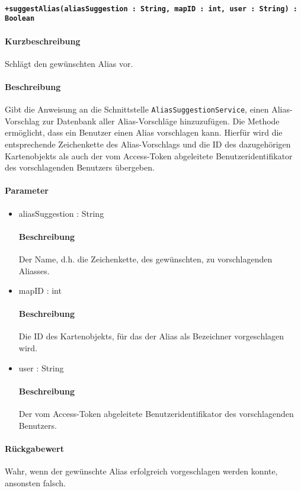 \paragraph*{\texttt{+suggestAlias(aliasSuggestion : String, mapID : int, user : String) : Boolean}}%
\paragraph*{Kurzbeschreibung}
Schlägt den gewünschten Alias vor.
\paragraph*{Beschreibung}
Gibt die Anweisung an die Schnittstelle \texttt{AliasSuggestionService}, einen Alias-Vorschlag zur Datenbank aller Alias-Vorschläge hinzuzufügen.
Die Methode ermöglicht, dass ein Benutzer einen Alias vorschlagen kann. 
Hierfür wird die entsprechende Zeichenkette des Alias-Vorschlags und die ID des dazugehörigen Kartenobjekts als auch der vom Access-Token abgeleitete Benutzeridentifikator des vorschlagenden Benutzers übergeben.
\paragraph*{Parameter}
\begin{itemize}
	\item aliasSuggestion : String
		\paragraph*{Beschreibung}
		Der Name, d.h. die Zeichenkette, des gewünschten, zu vorschlagenden Aliasses.
	\item mapID : int
		\paragraph*{Beschreibung}
		Die ID des Kartenobjekts, für das der Alias als Bezeichner vorgeschlagen wird.
	\item user : String
		\paragraph*{Beschreibung}
		Der vom Access-Token abgeleitete Benutzeridentifikator des vorschlagenden Benutzers.
\end{itemize}
\paragraph*{Rückgabewert}
Wahr, wenn der gewünschte Alias erfolgreich vorgeschlagen werden konnte, ansonsten falsch.
